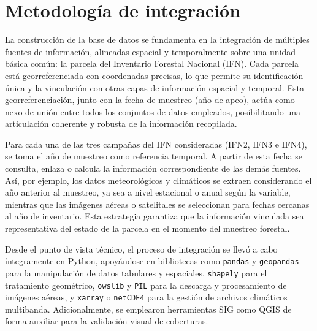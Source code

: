 \section{Metodología de integración}



La construcción de la base de datos se fundamenta en la integración de múltiples fuentes de información, alineadas espacial y temporalmente sobre una unidad básica común: la parcela del Inventario Forestal Nacional (IFN). Cada parcela está georreferenciada con coordenadas precisas, lo que permite su identificación única y la vinculación con otras capas de información espacial y temporal. Esta georreferenciación, junto con la fecha de muestreo (año de apeo), actúa como nexo de unión entre todos los conjuntos de datos empleados, posibilitando una articulación coherente y robusta de la información recopilada.

\medskip

Para cada una de las tres campañas del IFN consideradas (IFN2, IFN3 e IFN4), se toma el año de muestreo como referencia temporal. A partir de esta fecha se consulta, enlaza o calcula la información correspondiente de las demás fuentes. Así, por ejemplo, los datos meteorológicos y climáticos se extraen considerando el año anterior al muestreo, ya sea a nivel estacional o anual según la variable, mientras que las imágenes aéreas o satelitales se seleccionan para fechas cercanas al año de inventario. Esta estrategia garantiza que la información vinculada sea representativa del estado de la parcela en el momento del muestreo forestal.

\medskip

Desde el punto de vista técnico, el proceso de integración se llevó a cabo íntegramente en Python, apoyándose en bibliotecas como \texttt{pandas} y \texttt{geopandas} para la manipulación de datos tabulares y espaciales, \texttt{shapely} para el tratamiento geométrico, \texttt{owslib} y \texttt{PIL} para la descarga y procesamiento de imágenes aéreas, y \texttt{xarray} o \texttt{netCDF4} para la gestión de archivos climáticos multibanda. Adicionalmente, se emplearon herramientas SIG como QGIS de forma auxiliar para la validación visual de coberturas.

